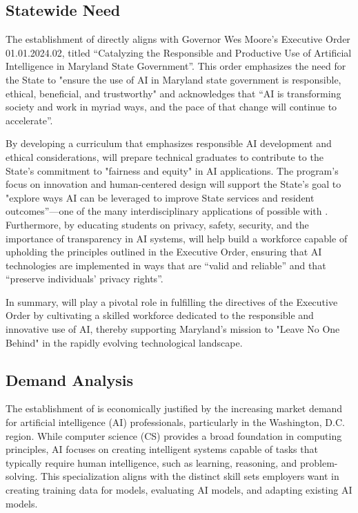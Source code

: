 

\subsection{Statewide Need}

The establishment of \name{} directly aligns with Governor Wes Moore's Executive Order 01.01.2024.02, titled ``Catalyzing the Responsible and Productive Use of Artificial Intelligence in Maryland State Government''. This order emphasizes the need for the State to "ensure the use of AI in Maryland state government is responsible, ethical, beneficial, and trustworthy" and acknowledges that ``AI is transforming society and work in myriad ways, and the pace of that change will continue to accelerate''. 

By developing a curriculum that emphasizes responsible AI development and ethical considerations, \short{} will prepare technical graduates to contribute to the State's commitment to "fairness and equity" in AI applications. The program's focus on innovation and human-centered design will support the State's goal to "explore ways AI can be leveraged to improve State services and resident outcomes''---one of the many interdisciplinary applications of \ai{} possible with \short{}. Furthermore, by educating students on privacy, safety, security, and the importance of transparency in AI systems, \short{} will help build a workforce capable of upholding the principles outlined in the Executive Order, ensuring that AI technologies are implemented in ways that are ``valid and reliable'' and that ``preserve individuals' privacy rights''. 

In summary, \short{} will play a pivotal role in fulfilling the directives of the Executive Order by cultivating a skilled workforce dedicated to the responsible and innovative use of AI, thereby supporting Maryland's mission to "Leave No One Behind" in the rapidly evolving technological landscape. 


\subsection{Demand Analysis}

The establishment of \name{} is economically justified by the increasing market demand for artificial intelligence (AI) professionals, particularly in the Washington, D.C. region. While computer science (CS) provides a broad foundation in computing principles, AI focuses on creating intelligent systems capable of tasks that typically require human intelligence, such as learning, reasoning, and problem-solving. This specialization aligns with the distinct skill sets employers want in creating training data for models, evaluating AI models, and adapting existing AI models.

